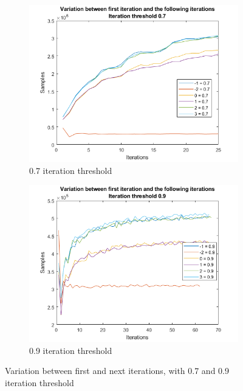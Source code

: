 \begin{figure}
    \centering
    \begin{subfigure}[b]{.49\textwidth}
        \centering
        \includegraphics[width=\textwidth]{figures/varfirst-0.7.png}
        \caption{0.7 iteration threshold}
        \label{sfig:iter:varfirst0.7}
    \end{subfigure}
    \hfill
    \begin{subfigure}[b]{.49\textwidth}
        \centering
        \includegraphics[width=\textwidth]{figures/varfirst-0.9.png}
        \caption{0.9 iteration threshold}
        \label{sfig:iter:varfirst0.9}
    \end{subfigure}
    \caption{Variation between first and next iterations, with 0.7 and 0.9 iteration threshold}
    \label{fig:iter:varfirst0.70.9}
\end{figure}

